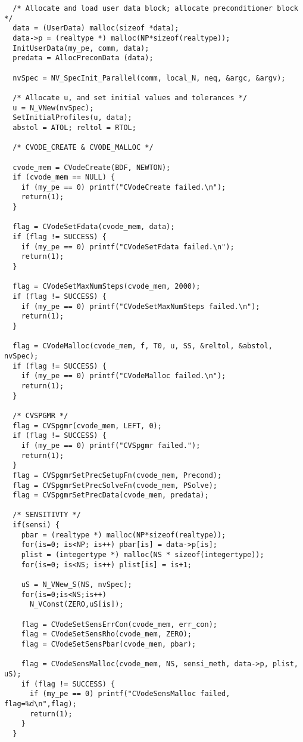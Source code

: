 \begin{verbatim}
  /* Allocate and load user data block; allocate preconditioner block */
  data = (UserData) malloc(sizeof *data);
  data->p = (realtype *) malloc(NP*sizeof(realtype));
  InitUserData(my_pe, comm, data);
  predata = AllocPreconData (data);

  nvSpec = NV_SpecInit_Parallel(comm, local_N, neq, &argc, &argv);

  /* Allocate u, and set initial values and tolerances */ 
  u = N_VNew(nvSpec);
  SetInitialProfiles(u, data);
  abstol = ATOL; reltol = RTOL;

  /* CVODE_CREATE & CVODE_MALLOC */

  cvode_mem = CVodeCreate(BDF, NEWTON);
  if (cvode_mem == NULL) { 
    if (my_pe == 0) printf("CVodeCreate failed.\n"); 
    return(1); 
  }

  flag = CVodeSetFdata(cvode_mem, data);
  if (flag != SUCCESS) { 
    if (my_pe == 0) printf("CVodeSetFdata failed.\n"); 
    return(1); 
  }

  flag = CVodeSetMaxNumSteps(cvode_mem, 2000);
  if (flag != SUCCESS) { 
    if (my_pe == 0) printf("CVodeSetMaxNumSteps failed.\n"); 
    return(1); 
  }

  flag = CVodeMalloc(cvode_mem, f, T0, u, SS, &reltol, &abstol, nvSpec);
  if (flag != SUCCESS) { 
    if (my_pe == 0) printf("CVodeMalloc failed.\n"); 
    return(1); 
  }

  /* CVSPGMR */
  flag = CVSpgmr(cvode_mem, LEFT, 0);
  if (flag != SUCCESS) { 
    if (my_pe == 0) printf("CVSpgmr failed."); 
    return(1); 
  }
  flag = CVSpgmrSetPrecSetupFn(cvode_mem, Precond);
  flag = CVSpgmrSetPrecSolveFn(cvode_mem, PSolve);
  flag = CVSpgmrSetPrecData(cvode_mem, predata);

  /* SENSITIVTY */
  if(sensi) {
    pbar = (realtype *) malloc(NP*sizeof(realtype));
    for(is=0; is<NP; is++) pbar[is] = data->p[is];
    plist = (integertype *) malloc(NS * sizeof(integertype));
    for(is=0; is<NS; is++) plist[is] = is+1;

    uS = N_VNew_S(NS, nvSpec);
    for(is=0;is<NS;is++)
      N_VConst(ZERO,uS[is]);

    flag = CVodeSetSensErrCon(cvode_mem, err_con);
    flag = CVodeSetSensRho(cvode_mem, ZERO);
    flag = CVodeSetSensPbar(cvode_mem, pbar);

    flag = CVodeSensMalloc(cvode_mem, NS, sensi_meth, data->p, plist, uS);
    if (flag != SUCCESS) {
      if (my_pe == 0) printf("CVodeSensMalloc failed, flag=%d\n",flag);
      return(1);
    }
  }


\end{verbatim}
